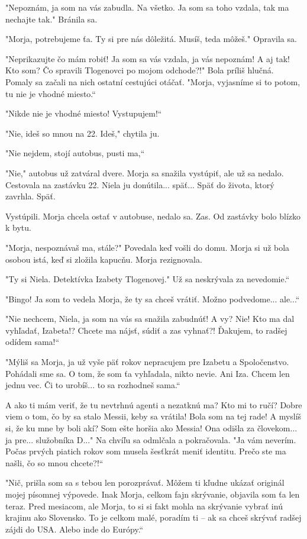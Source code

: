 \documentclass{book}
\begin{document}
"Nepoznám, ja som na vás zabudla. Na všetko. Ja som sa toho vzdala, tak ma nechajte tak."$ $ Bránila sa.

"Morja, potrebujeme ťa. Ty si pre nás dôležitá. Musíš, teda môžeš."$ $ Opravila sa.

"Neprikazujte čo mám robiť! Ja som sa vás vzdala, ja vás nepoznám! A aj tak! Kto som? Čo spravili Tlogenovci po mojom odchode?!"$ $ Bola príliš hlučná. Pomaly sa začali na nich ostatní cestujúci otáčať.
"Morja, vyjasníme si to potom, tu nie je vhodné miesto.“

"Nikde nie je vhodné miesto! Vystupujem!“

"Nie, ideš so mnou na 22. Ideš,"$ $ chytila ju.

"Nie nejdem, stojí autobus, pusti ma,“

"Nie,"$ $ autobus už zatváral dvere. Morja sa snažila vystúpiť, ale už sa nedalo. Cestovala na zastávku 22. Niela ju donútila... späť... Späť do života, ktorý zavrhla. Späť.

Vystúpili. Morja chcela ostať v autobuse, nedalo sa. Zas. Od zastávky bolo blízko k bytu.

"Morja, nespoznávaš ma, stále?"$ $ Povedala keď vošli do domu. Morja si už bola osobou istá, keď si zložila kapucňu. Morja rezignovala.

"Ty si Niela. Detektívka Izabety Tlogenovej."$ $ Už sa neskrývala za nevedomie.“

"Bingo! Ja som to vedela Morja, že ty sa chceš vrátiť. Možno podvedome... ale...“

"Nie nechcem, Niela, ja som na vás sa snažila zabudnúť! A vy? Nie! Kto ma dal vyhľadať, Izabeta!? Chcete ma nájsť, súdiť a zas vyhnať?! Ďakujem, to radšej odídem sama!“

"Mýliš sa Morja, ja už vyše päť rokov nepracujem pre Izabetu a Spoločenstvo. Pohádali sme sa. O tom, že som ťa vyhľadala, nikto nevie. Ani Iza. Chcem len jednu vec. Či to urobíš... to sa rozhodneš sama.“

$ $A ako ti mám veriť, že tu nevtrhnú agenti a nezatknú ma? Kto mi to ručí? Dobre viem o tom, čo by sa stalo Messii, keby sa vrátila! Bola som na tej rade! A myslíš si, že ku mne by boli akí? Som ešte horšia ako Messia! Ona odišla za človekom... ja pre... služobníka D..."$ $ Na chvíľu sa odmlčala a pokračovala. "Ja vám neverím. Počas prvých piatich rokov som musela šesťkrát meniť identitu. Prečo ste ma našli, čo so mnou chcete?!“

"Nič, prišla som sa s tebou len porozprávať. Môžem ti kľudne ukázať originál mojej písomnej výpovede. Inak Morja, celkom fajn skrývanie, objavila som ťa len teraz. Pred mesiacom, ale Morja, to si si fakt mohla na skrývanie vybrať inú krajinu ako Slovensko. To je celkom malé, poradím ti – ak sa chceš skrývať radšej zájdi do USA. Alebo inde do Európy.“
\end{document}
